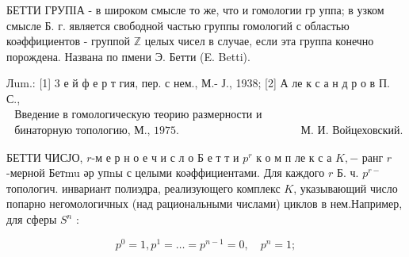 \documentclass[10pt]{article}
\begin{document}
БЕТТИ ГРУПІА - в широком смысле то же, что и гомологии гр уппа; в узком смысле Б. г. является свободной частью группы гомологий с областью коәффициентов - группой $\mathbb{Z}$ целых чисел в случае, если эта группа конечно порождена. Названа по пмени Э. Бетти (E. Betti).



Лum.: [1] 3 е й ф е р т гия, пер. с нем., М.- Ј., 1938; [2] А ле к с а н д р о в П. С., $\begin{array}{ll}\text { Введение в гомологическую теорию размерности и общую ком- } \\ \text { бинаторную топологию, М., 1975. } & \text { М. И. Войцеховский. }\end{array}$



БЕТТИ ЧИСЈО, $r$-м е р н о е ч и с л о Б е т т и $p^{r}$ к о м п ле к с а $K,-$ ранг $r$-мерной Бетmu әр упnы с целыми коәффициентами. Для каждого $r$ Б. ч. $p^{r-}$ топологич. инвариант полиэдра, реализующего комплекс $K$, указывающий число попарно негомологичных (над рациональными числами) циклов в нем.Например, для сферы $S^{n}$ :



\[

p^{0}=1, p^{1}=\ldots=p^{n-1}=0, \quad p^{n}=1 ;

\]
\end{document}
